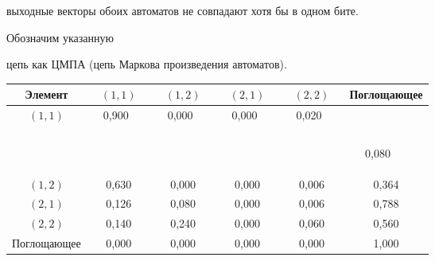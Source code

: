 \begin{multicols}{2}
выходные векторы обоих автоматов не совпадают хотя бы в одном бите.


Обозначим указанную


цепь как ЦМПА (цепь Маркова произведения автоматов).








\begin{table}[b]\small %


\begin{center}




\vspace*{2ex}





\begin{tabular}{|c||c|c|c|c|c|}


\hline


Элемент& $(1,1)$ & $(1,2)$ & $(2,1)$ & $(2,2)$ & Поглощающее \\




\hline


$(1,1)$ &\ \ 0,900\ \ \ &\ \ 0,000\ \ \ &\ \ 0,000\ \ \ &\ \ 0,020\ \ \ &\ \


0,080\ \ \ \\




$(1,2)$ & 0,630 & 0,000 & 0,000 & 0,006 & 0,364 \\




$(2,1)$ & 0,126 & 0,080 & 0,000 & 0,006 & 0,788 \\




$(2,2)$ & 0,140 & 0,240 & 0,000 & 0,060 & 0,560 \\




Поглощающее & 0,000 & 0,000 & 0,000 & 0,000 & 1,000 \\


\hline


\end{tabular}


\end{center}


\end{table}






\end{multicols}
